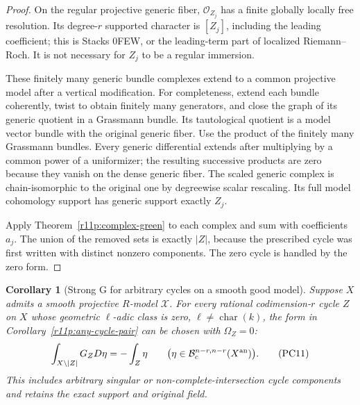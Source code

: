 \documentclass[11pt]{article}
\newtheorem{corollary}[theorem]{Corollary}
\theoremstyle{definition}
\theoremstyle{remark}
\numberwithin{equation}{section}
\begin{document}
\begin{proof}
On the regular projective generic fiber, $\mathcal O_{Z_j}$ has a
finite globally locally free resolution.  Its degree-$r$ supported
character is $[Z_j]$, including the leading coefficient; this is
Stacks 0FEW, or the leading-term part of localized Riemann--Roch.
It is not necessary for $Z_j$ to be a regular immersion.

These finitely many generic bundle complexes extend to a common
projective model after a vertical modification.  For completeness,
extend each bundle coherently, twist to obtain finitely many generators,
and close the graph of its generic quotient in a Grassmann bundle.
Its tautological quotient is a model vector bundle with the original
generic fiber.  Use the product of the finitely many Grassmann bundles.
Every generic differential extends after multiplying by a common
power of a uniformizer; the resulting successive products are zero
because they vanish on the dense generic fiber.  The scaled generic
complex is chain-isomorphic to the original one by degreewise scalar
rescaling.  Its full model cohomology support has generic support
exactly $Z_j$.

Apply Theorem~\ref{r11p:complex-green} to each complex and sum with
coefficients $a_j$.  The union of the removed sets is exactly
$|Z|$, because the prescribed cycle was first written with distinct
nonzero components.  The zero cycle is handled by the zero form.
\end{proof}

\begin{corollary}[Strong G for arbitrary cycles on a smooth good model]
\label{r11p:good-reduction-G}
Suppose $X$ admits a smooth projective $R$-model $\mathcal X$.
For every rational codimension-$r$ cycle $Z$ on $X$ whose geometric
$\ell$-adic class is zero, $\ell\ne\operatorname{char}(k)$, the form
in Corollary~\ref{r11p:any-cycle-pair} can be chosen with
$\Omega_Z=0$:
\[
                  \int_{X\setminus|Z|}G_ZD\eta=-\int_Z\eta
       \qquad
       \bigl(\eta\in\mathcal B_c^{n-r,n-r}(X^{\rm an})\bigr).
\tag{PC11}\label{r11p:good-reduction-zero}
\]
This includes arbitrary singular or non-complete-intersection cycle
components and retains the exact support and original field.
\end{corollary}
\end{document}
